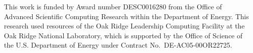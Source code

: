 \documentclass[smallextended]{svjour3}      %
\begin{document}

%

\begin{acknowledgements}
    This work is funded by Award number DESC0016280 from the Office of Advanced
    Scientific Computing Research within the Department of Energy. This
    research used resources of the Oak Ridge Leadership Computing Facility at
    the Oak Ridge National Laboratory, which is supported by the Office of
    Science of the U.S. Department of Energy under Contract
    No.\ DE-AC05-00OR22725.
\end{acknowledgements}






\end{document}
